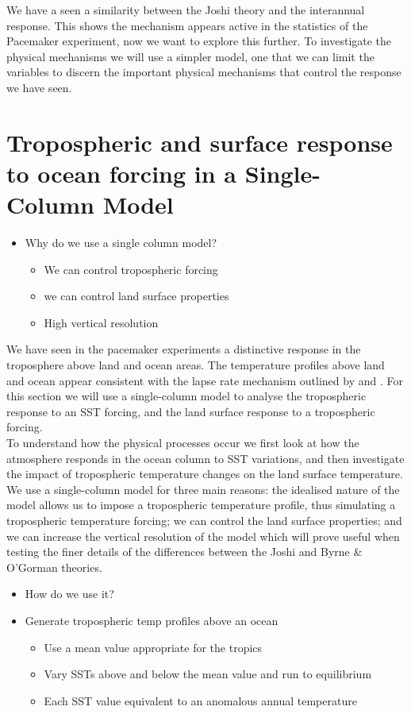 We have a seen a similarity between the Joshi theory and the interannual 
response. This shows the mechanism appears active in the statistics of the 
Pacemaker experiment, now we want to explore this further. To investigate the 
physical mechanisms we will use a simpler model, one that we can limit the 
variables to discern the important physical mechanisms that control the response 
we have seen.

\section{Tropospheric and surface response to ocean forcing in a Single-Column 
Model}
\label{mech_scm}

\begin{itemize}
	\item Why do we use a single column model?
		\begin{itemize}
			\item We can control tropospheric forcing
			\item we can control land surface properties
			\item High vertical resolution
		\end{itemize}
\end{itemize}

We have seen in the pacemaker experiments a distinctive response in the 
troposphere above land and ocean areas. The temperature profiles above land and 
ocean appear consistent with the lapse rate mechanism outlined by 
\citet{Joshi2007} and \citet{Byrne2013}. For this section we will use a 
single-column model to analyse the tropospheric response to an SST forcing, and 
the land surface response to a tropospheric forcing.\\
To understand how the physical processes occur we first look at how the 
atmosphere responds in the ocean column to SST variations, and then investigate 
the impact of tropospheric temperature changes on the land surface 
temperature.\\
We use a single-column model for three main reasons: the idealised nature of the 
model allows us to impose a tropospheric temperature profile, thus simulating a 
tropospheric temperature forcing; we can control the land surface properties; 
and we can increase the vertical resolution of the model which will prove useful 
when testing the finer details of the differences between the Joshi and Byrne \& 
O'Gorman theories.\\

\begin{itemize}
	\item How do we use it?
	\item Generate tropospheric temp profiles above an ocean
		\begin{itemize}
			\item Use a mean value appropriate for the tropics
			\item Vary SSTs above and below the mean value and run to 
				equilibrium
			\item Each SST value equivalent to an anomalous annual temperature
		\end{itemize}
\end{itemize}

